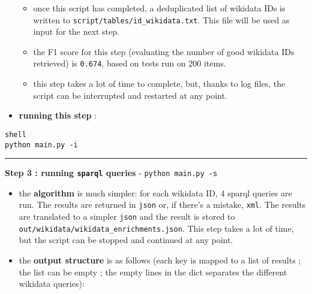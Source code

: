 \begin{itemize}
\begin{itemize}
\begin{itemize}
\end{itemize}
\item once this script has completed, a deduplicated list of wikidata IDs is written to \texttt{script/tables/id\_wikidata.txt}. This file will be used as input for the next step.
\item the F1 score for this step (evaluating the number of good wikidata IDs retrieved) is \texttt{0.674}, based on tests run on 200 items.
\item this step takes a lot of time to complete, but, thanks to log files, the script can be interrupted and restarted at any point.
\end{itemize}
\item \textbf{running this step} : 
\end{itemize}

\begin{lstlisting}
shell
python main.py -i
\end{lstlisting}

\par\noindent\rule{\linewidth}{0.4pt}

\textbf{Step 3 : running \texttt{sparql} queries} - \texttt{python main.py -s}

\begin{itemize}
\item the \textbf{algorithm} is much simpler: for each wikidata ID, 4 sparql queries are run. The results are returned in \texttt{json} or, if there's a mistake, \texttt{xml}. The results are translated to a simpler \texttt{json} and the result is stored to \texttt{out/wikidata/wikidata\_enrichments.json}. This step takes a lot of time, but the script can be stopped and continued at any point.
\item the \textbf{output structure} is as follows (each key is mapped to a list of results ; the list can be empty ; the empty lines in the dict separates the different wikidata queries): 
\end{itemize}


